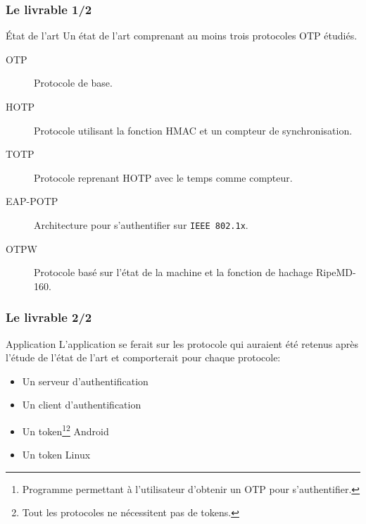 \documentclass[xcolor=table]{beamer}
\begin{document}
\begin{frame}
\frametitle{Le livrable 1/2}
\begin{block}{État de l'art} 
Un état de l'art comprenant au moins trois protocoles OTP étudiés.
\begin{description}
 \item[OTP] Protocole de base.
 \item[HOTP] Protocole utilisant la fonction HMAC et un compteur de 
  synchronisation.
 \item[TOTP] Protocole reprenant HOTP avec le temps comme compteur.
 \item[EAP-POTP] Architecture pour s'authentifier sur \verb?IEEE 802.1x?. 
 \item[OTPW] Protocole basé sur l'état de la machine et la fonction de hachage RipeMD-160.
\end{description}
\end{block}
\end{frame}

\begin{frame}
\frametitle{Le livrable 2/2}
\begin{block}{Application}
    L'application se ferait sur les protocole qui auraient été retenus après l'étude de 
  l'état de l'art et comporterait pour chaque protocole:
  \begin{itemize}
    \item Un serveur d'authentification
    \item Un client d'authentification
    \item Un token\footnote[1]{Programme permettant à l'utilisateur d'obtenir un 
      OTP pour s'authentifier.}\footnote[2]{Tout les protocoles ne 
      nécessitent pas de tokens.} Android
    \item Un token Linux
  \end{itemize}
\end{block}

\end{frame}

\end{document}
